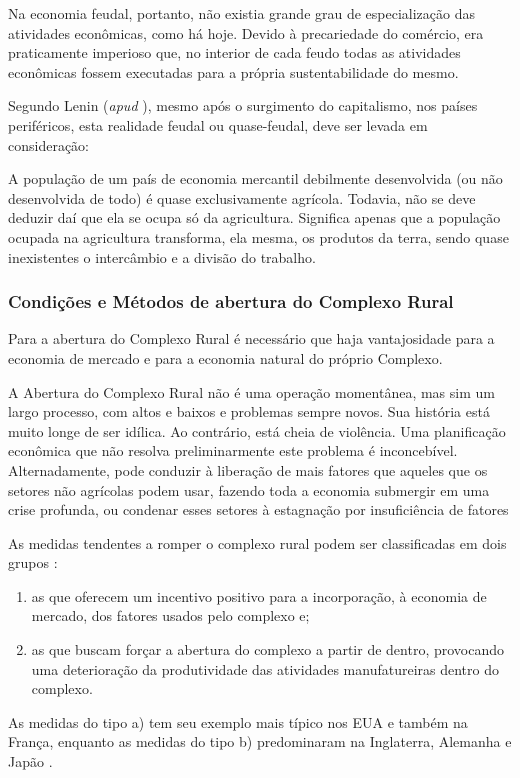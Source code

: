 \documentclass[
	12pt,				%
	oneside,			%
	a4paper,			%
	chapter=TITLE,		%
	section=TITLE,		%
	english,			%
	brazil				%
	]{abntex2}
\begin{document}
\begin{refsection}
Na economia feudal, portanto, não existia grande grau de especialização das
atividades econômicas, como há hoje. Devido à precariedade do comércio, era
praticamente imperioso que, no interior de cada feudo todas as atividades
econômicas fossem executadas para a própria sustentabilidade do mesmo.

Segundo Lenin (\emph{apud} \textcite[p.~99]{rangel1954}), mesmo após o surgimento do capitalismo,
nos países periféricos, esta realidade feudal ou quase-feudal, deve ser levada
em consideração:
\begin{citacao} 
A população de um país de economia mercantil debilmente desenvolvida (ou não 
desenvolvida de todo) é quase exclusivamente agrícola. Todavia, não se deve 
deduzir daí que ela se ocupa só da agricultura. Significa apenas que a população 
ocupada na agricultura transforma, ela mesma, os produtos da terra, sendo quase 
inexistentes o intercâmbio e a divisão do trabalho. 
\end{citacao}
\hypertarget{condiuxe7uxf5es-e-muxe9todos-de-abertura-do-complexo-rural}{%
\subsubsection{Condições e Métodos de abertura do Complexo Rural}\label{condiuxe7uxf5es-e-muxe9todos-de-abertura-do-complexo-rural}}

Para a abertura do Complexo Rural é necessário que haja vantajosidade para a
economia de mercado e para a economia natural do próprio Complexo.
\begin{citacao} 
A Abertura do Complexo Rural não é uma operação momentânea, mas sim um largo
processo, com altos e baixos e problemas sempre novos. Sua história está muito
longe de ser idílica. Ao contrário, está cheia de violência. Uma planificação
econômica que não resolva preliminarmente este problema é inconcebível.
Alternadamente, pode conduzir à liberação de mais fatores que aqueles que os
setores não agrícolas podem usar, fazendo toda a economia submergir em uma crise
profunda, ou condenar esses setores à estagnação por insuficiência de
fatores \cite[p.~118]{rangel1954}
\end{citacao}
As medidas tendentes a romper o complexo rural podem ser classificadas em dois
grupos \autocite[113]{rangel1954}:
\begin{enumerate}
\def\labelenumi{\alph{enumi}.}
\item
  as que oferecem um incentivo positivo para a incorporação, à economia de
  mercado, dos fatores usados pelo complexo e;
\item
  as que buscam forçar a abertura do complexo a partir de dentro, provocando
  uma deterioração da produtividade das atividades manufatureiras dentro do
  complexo.
\end{enumerate}
As medidas do tipo a) tem seu exemplo mais típico nos \gls{EUA} e também na
França, enquanto as medidas do tipo b) predominaram na Inglaterra, Alemanha e
Japão \autocite[114-115]{rangel1954}.


\end{refsection}
\end{document}
